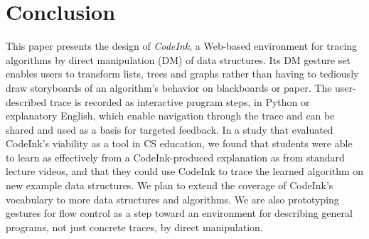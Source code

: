 \section{Conclusion}

This paper presents the design of \emph{CodeInk}, a Web-based environment for
tracing algorithms by direct manipulation (DM) of data structures. Its DM
gesture set enables users to transform lists, trees and graphs rather than
having to tediously draw storyboards of an algorithm's behavior on blackboards
or paper. The user-described trace is recorded as interactive program steps, in
Python or explanatory English, which enable navigation through the trace and can
be shared and used as a basis for targeted feedback. In a study that evaluated
CodeInk's viability as a tool in CS education, we found that students were able
to learn as effectively from a CodeInk-produced explanation as from standard
lecture videos, and that they could use CodeInk to trace the learned algorithm
on new example data structures. We plan to extend the coverage of CodeInk's
vocabulary to more data structures and algorithms. We are also prototyping
gestures for flow control as a step toward an environment for
describing general programs, not just concrete traces, by direct
manipulation.
